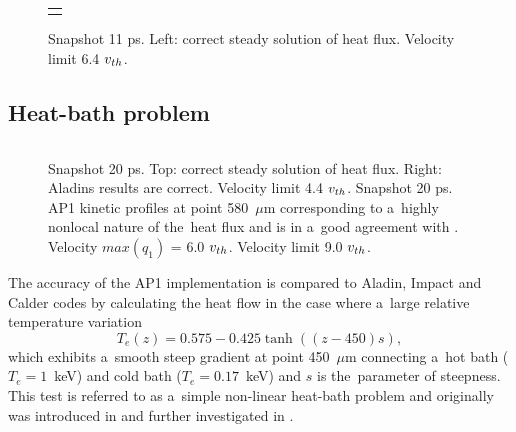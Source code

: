 \begin{figure}[tbh]
  \begin{center}
    \begin{tabular}{c}
	  \\ 
	  \\ 
    \end{tabular}
  \caption{  
  Snapshot 11 ps. Left: correct steady solution of heat flux. 
  Velocity limit 6.4 $v_{th}$.
  }
  \label{fig:C7_Calder_case1}
  \end{center} 
\end{figure}

\subsection{Heat-bath problem}  
\label{sec:heatbath_test}

\begin{figure}[tbh]
  \begin{center}
    \begin{tabular}{c}
    \end{tabular}
  \caption{  
  Snapshot 20 ps. Top: correct steady solution of heat flux. 
  Right: Aladins results are correct. Velocity limit 4.4 $v_{th}$.
  Snapshot 20 ps. AP1 kinetic profiles at point 580~$\mu$m corresponding to 
  a~highly nonlocal nature of the~heat flux %
  and is in a~good agreement with
  \cite{Sherlock_PoP2017}. Velocity $max(q_1)$ = 6.0 $v_{th}$. 
  Velocity limit 9.0 $v_{th}$.
  }
  \label{fig:C7_Aladin_case5}
  \end{center} 
\end{figure}

The accuracy of the AP1 implementation is compared to Aladin, Impact and Calder
codes by calculating the heat flow in the case
where a~large relative temperature variation
\begin{equation}
  T_e(z) = 0.575 - 0.425 \tanh\left((z-450) s\right) ,
  \label{eq:T_init}
\end{equation}
which exhibits a~smooth steep gradient at point 450~$\mu$m 
connecting a~hot bath ($T_e = 1$~keV) 
and cold bath ($T_e = 0.17$~keV) and $s$ is the~parameter of steepness. 
This test is referred to as a~simple non-linear heat-bath problem and
originally was introduced in \cite{marocchino2013} and further investigated
in  \cite{Sorbo_2015, Sorbo_2016, Sherlock_PoP2017, Brodrick_PoP2017}.

